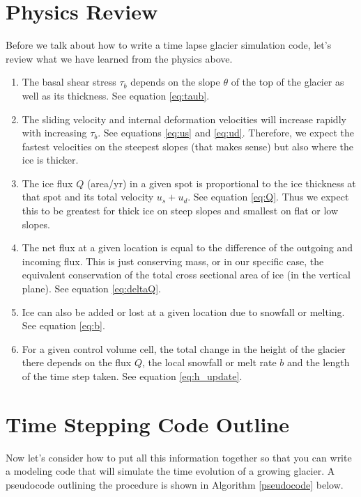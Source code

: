 \documentclass[11pt, oneside]{article}   	%
\begin{document}
 \section*{Physics Review}
 Before we talk about how to write a time lapse glacier simulation code, let's review what we have learned from the physics above.
 \begin{enumerate}
\item The basal shear stress $\tau_b$ depends on the slope $\theta$ of the top of the glacier as well as its thickness. See equation \ref{eq:taub}.
\item The sliding velocity and internal deformation velocities will increase rapidly with increasing $\tau_b$. See equations \ref{eq:us} and \ref{eq:ud}. Therefore, we expect the fastest velocities on the steepest slopes (that makes sense) but also where the ice is thicker.
\item The ice flux $Q$ (area/yr) in a given spot is proportional to the ice thickness at that spot and its total velocity $u_s + u_d$. See equation \ref{eq:Q}. Thus we expect this to be greatest for thick ice on steep slopes and smallest on flat or low slopes.
\item The net flux at a given location is equal to the difference of the outgoing and incoming flux. This is just conserving mass, or in our specific case, the equivalent conservation of the total cross sectional area of ice (in the vertical plane). See equation \ref{eq:deltaQ}.
\item Ice can also be added or lost at a given location due to snowfall or melting. See equation \ref{eq:b}.
\item For a given control volume cell, the total change in the height of the glacier there depends on the flux $Q$, the local snowfall or melt  rate $b$ and the length of the time step taken. See equation \ref{eq:h_update}.
\end{enumerate}

 
 \section*{Time Stepping  Code Outline}
 
Now let's consider how to put all this information together so that you can write a modeling code that will simulate the time evolution of a growing glacier.  A pseudocode outlining the procedure is shown in Algorithm \ref{pseudocode} below.
\end{document}
